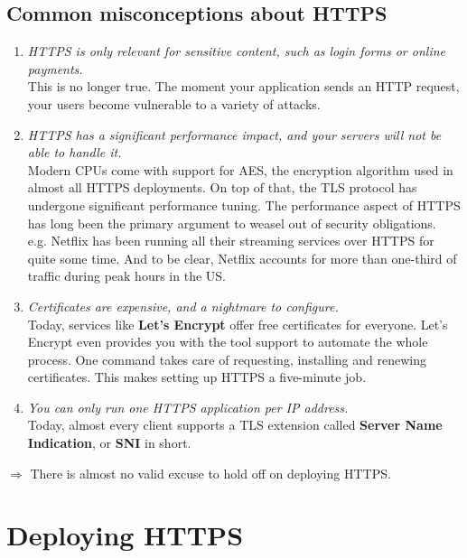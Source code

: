 \documentclass[../main.tex]{subfiles}
\begin{document}
\subsection{Common misconceptions about HTTPS}
\begin{enumerate}
\item \emph{HTTPS is only relevant for sensitive content, such as login forms or online payments.}\\[0.2cm]
This is no longer true. The moment your application sends an HTTP request, your users become vulnerable to a
variety of attacks.
\item \emph{HTTPS has a significant performance impact, and your servers will not be able to handle it.}\\[0.2cm]
Modern CPUs come with support for AES, the encryption algorithm used in almost all HTTPS
deployments. On top of that, the TLS protocol has undergone significant performance tuning. The performance aspect of HTTPS has long been the primary argument to weasel out of security obligations.\\[0.2cm]
e.g. Netflix has been running all their streaming services over HTTPS for quite some time. And to be clear, Netflix accounts for more than one-third of traffic during peak hours in the US.
\item \emph{Certificates are expensive, and a nightmare to configure.}\\[0.2cm]
Today, services like \textbf{Let’s Encrypt} offer free certificates for everyone. Let’s Encrypt even provides you with the tool support to automate the whole process. One command takes care of requesting, installing and renewing certificates. This makes setting up HTTPS a five-minute job.
\item \emph{You can only run one HTTPS application per IP address.}\\[0.2cm]
Today, almost every client supports a TLS extension called \textbf{Server Name Indication}, or \textbf{SNI} in short.
\end{enumerate}
$\Rightarrow$ There is almost no valid excuse to hold off on deploying HTTPS.
\clearpage

\section{Deploying HTTPS}
\end{document}
